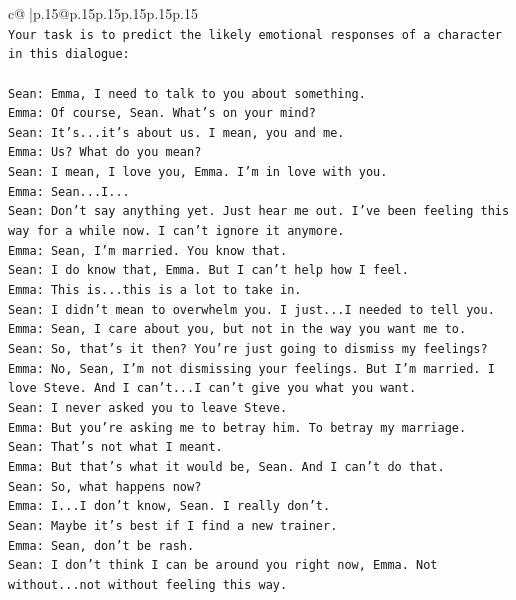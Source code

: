 \documentclass{article}
\begin{document}
{\begin{supertabular}{c@{$\;$}|p{.15\linewidth}@{}p{.15\linewidth}p{.15\linewidth}p{.15\linewidth}p{.15\linewidth}p{.15\linewidth}}
{{{\\ 
\texttt{Your task is to predict the likely emotional responses of a character in this dialogue:} \\
\\ 
\texttt{Sean: Emma, I need to talk to you about something.} \\
\texttt{Emma: Of course, Sean. What's on your mind?} \\
\texttt{Sean: It's...it's about us. I mean, you and me.} \\
\texttt{Emma: Us? What do you mean?} \\
\texttt{Sean: I mean, I love you, Emma. I'm in love with you.} \\
\texttt{Emma: Sean...I...} \\
\texttt{Sean: Don't say anything yet. Just hear me out. I've been feeling this way for a while now. I can't ignore it anymore.} \\
\texttt{Emma: Sean, I'm married. You know that.} \\
\texttt{Sean: I do know that, Emma. But I can't help how I feel.} \\
\texttt{Emma: This is...this is a lot to take in.} \\
\texttt{Sean: I didn't mean to overwhelm you. I just...I needed to tell you.} \\
\texttt{Emma: Sean, I care about you, but not in the way you want me to.} \\
\texttt{Sean: So, that's it then? You're just going to dismiss my feelings?} \\
\texttt{Emma: No, Sean, I'm not dismissing your feelings. But I'm married. I love Steve. And I can't...I can't give you what you want.} \\
\texttt{Sean: I never asked you to leave Steve.} \\
\texttt{Emma: But you're asking me to betray him. To betray my marriage.} \\
\texttt{Sean: That's not what I meant.} \\
\texttt{Emma: But that's what it would be, Sean. And I can't do that.} \\
\texttt{Sean: So, what happens now?} \\
\texttt{Emma: I...I don't know, Sean. I really don't.} \\
\texttt{Sean: Maybe it's best if I find a new trainer.} \\
\texttt{Emma: Sean, don't be rash.} \\
\texttt{Sean: I don't think I can be around you right now, Emma. Not without...not without feeling this way.} \\
}}}
\end{supertabular}}
\end{document}
